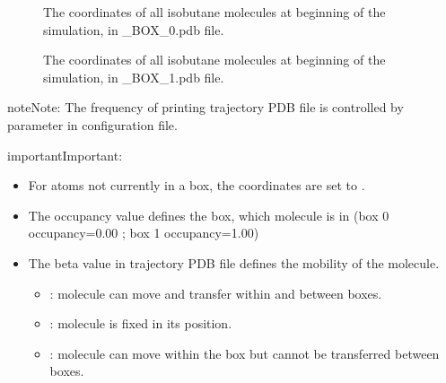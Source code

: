 \documentclass[letterpaper,10pt,english]{sphinxmanual}
\begin{document}
\begin{figure}[htbp]
\centering
\capstart

\noindent{}
\caption{The coordinates of all isobutane molecules at beginning of the simulation, in \_BOX\_0.pdb file.}\label{\detokenize{output_file:id8}}\end{figure}

\begin{figure}[htbp]
\centering
\capstart

\noindent{}
\caption{The coordinates of all isobutane molecules at beginning of the simulation, in \_BOX\_1.pdb file.}\label{\detokenize{output_file:id9}}\end{figure}

\begin{sphinxadmonition}{note}{Note:}
\sphinxAtStartPar
The frequency of printing trajectory PDB file is controlled by 
parameter in configuration file.
\end{sphinxadmonition}

\begin{sphinxadmonition}{important}{Important:}\begin{itemize}
\item {} 
\sphinxAtStartPar
For atoms not currently in a box, the coordinates are set to .

\item {} 
\sphinxAtStartPar
The occupancy value defines the box, which molecule is in (box 0 occupancy=0.00 ; box 1 occupancy=1.00)

\item {} 
\sphinxAtStartPar
The beta value in trajectory PDB file defines the mobility of the molecule.
\begin{itemize}
\item {} 
\sphinxAtStartPar
{}: molecule can move and transfer within and between boxes.

\item {} 
\sphinxAtStartPar
{}: molecule is fixed in its position.

\item {} 
\sphinxAtStartPar
{}: molecule can move within the box but cannot be transferred between boxes.

\end{itemize}

\end{itemize}
\end{sphinxadmonition}
\end{document}
